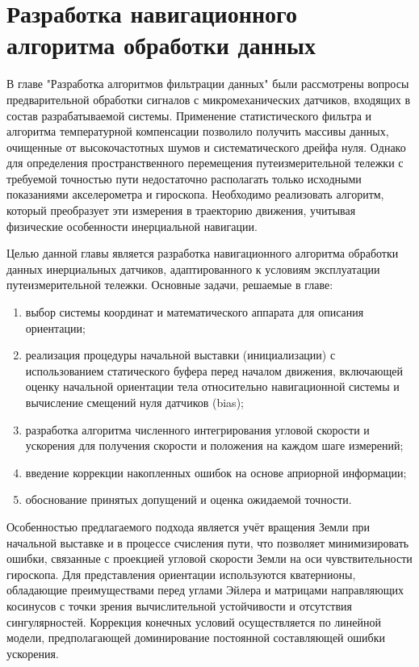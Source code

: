 \section{Разработка навигационного алгоритма обработки данных}
\label{sec:nav_algoritm}


В главе "Разработка алгоритмов фильтрации данных" были рассмотрены вопросы предварительной обработки сигналов с микромеханических датчиков, входящих в состав разрабатываемой системы. Применение статистического фильтра и алгоритма температурной компенсации позволило получить массивы данных, очищенные от высокочастотных шумов и систематического дрейфа нуля. Однако для определения пространственного перемещения путеизмерительной тележки с требуемой точностью пути недостаточно располагать только исходными показаниями акселерометра и гироскопа. Необходимо реализовать алгоритм, который преобразует эти измерения в траекторию движения, учитывая физические особенности инерциальной навигации.

Целью данной главы является разработка навигационного алгоритма обработки данных инерциальных датчиков, адаптированного к условиям эксплуатации путеизмерительной тележки. Основные задачи, решаемые в главе:

\begin{enumerate}
	\item выбор системы координат и математического аппарата для описания ориентации;
	\item реализация процедуры начальной выставки (инициализации) с использованием статического буфера перед началом движения, включающей оценку начальной ориентации тела относительно навигационной системы и вычисление смещений нуля датчиков (bias);
	\item разработка алгоритма численного интегрирования угловой скорости и ускорения для получения скорости и положения на каждом шаге измерений;
	\item введение коррекции накопленных ошибок на основе априорной информации;
	\item обоснование принятых допущений и оценка ожидаемой точности.
\end{enumerate}


Особенностью предлагаемого подхода является учёт вращения Земли при начальной выставке и в процессе счисления пути, что позволяет минимизировать ошибки, связанные с проекцией угловой скорости Земли на оси чувствительности гироскопа. Для представления ориентации используются кватернионы, обладающие преимуществами перед углами Эйлера и матрицами направляющих косинусов с точки зрения вычислительной устойчивости и отсутствия сингулярностей. Коррекция конечных условий осуществляется по линейной модели, предполагающей доминирование постоянной составляющей ошибки ускорения.

